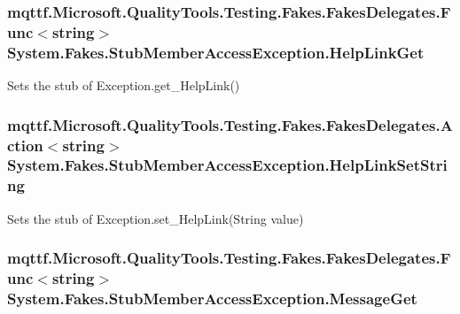 \hypertarget{class_system_1_1_fakes_1_1_stub_member_access_exception_a9c1e5226b5d1e978f0a165d4e1a89958}{
\subsubsection[{Help\-Link\-Get}]{\setlength{\rightskip}{0pt plus 5cm}mqttf.\-Microsoft.\-Quality\-Tools.\-Testing.\-Fakes.\-Fakes\-Delegates.\-Func$<$string$>$ System.\-Fakes.\-Stub\-Member\-Access\-Exception.\-Help\-Link\-Get}}\label{class_system_1_1_fakes_1_1_stub_member_access_exception_a9c1e5226b5d1e978f0a165d4e1a89958}


Sets the stub of Exception.\-get\-\_\-\-Help\-Link()

\hypertarget{class_system_1_1_fakes_1_1_stub_member_access_exception_a2ffabc67d6aeed5b93773241b6c3639d}{
\subsubsection[{Help\-Link\-Set\-String}]{\setlength{\rightskip}{0pt plus 5cm}mqttf.\-Microsoft.\-Quality\-Tools.\-Testing.\-Fakes.\-Fakes\-Delegates.\-Action$<$string$>$ System.\-Fakes.\-Stub\-Member\-Access\-Exception.\-Help\-Link\-Set\-String}}\label{class_system_1_1_fakes_1_1_stub_member_access_exception_a2ffabc67d6aeed5b93773241b6c3639d}


Sets the stub of Exception.\-set\-\_\-\-Help\-Link(\-String value)

\hypertarget{class_system_1_1_fakes_1_1_stub_member_access_exception_ac8ba6577e0eca5044b532abe46d820e8}{
\subsubsection[{Message\-Get}]{\setlength{\rightskip}{0pt plus 5cm}mqttf.\-Microsoft.\-Quality\-Tools.\-Testing.\-Fakes.\-Fakes\-Delegates.\-Func$<$string$>$ System.\-Fakes.\-Stub\-Member\-Access\-Exception.\-Message\-Get}}\label{class_system_1_1_fakes_1_1_stub_member_access_exception_ac8ba6577e0eca5044b532abe46d820e8}


